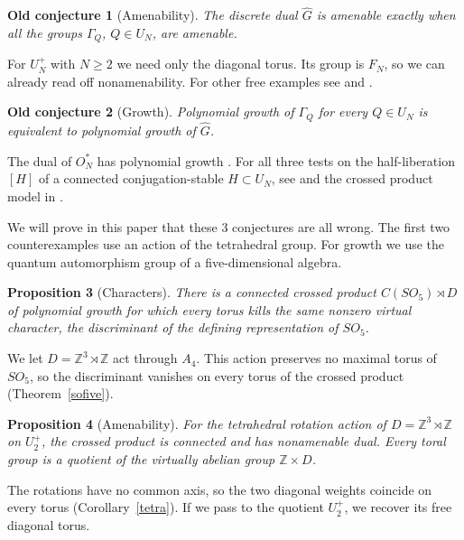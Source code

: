 \documentclass[11pt,a4paper]{article}
\newtheorem{oldconj}{Old conjecture}
\newtheorem{introprop}[oldconj]{Proposition}
\theoremstyle{remark}
\begin{document}
\begin{oldconj}[Amenability]\label{oldamen}
The discrete dual $\widehat G$ is amenable exactly when all the groups
$\Gamma_Q$, $Q\in U_N$, are amenable.
\end{oldconj}

For $U_N^+$ with $N\ge2$ we need only the diagonal torus. Its group
is $F_N$, so we can already read off nonamenability. For other free examples
see \cite[Theorem~4.4]{bp} and \cite[Chapter~14]{qg}.

\begin{oldconj}[Growth]\label{oldgrowth}
Polynomial growth of $\Gamma_Q$ for every $Q\in U_N$ is equivalent to
polynomial growth of $\widehat G$.
\end{oldconj}

The dual of $O_N^*$ has polynomial growth \cite[Section~9]{halforth}.
For all three tests on the half-liberation $[H]$ of a connected
conjugation-stable $H\subset U_N$, see \cite[Theorem~5.5]{bp} and the
crossed product model in \cite{halfhopf}.

We will prove in this paper that these 3 conjectures are all wrong.
The first two counterexamples use an action of the tetrahedral group.
For growth we use the quantum automorphism group of a five-dimensional algebra.

\begin{introprop}[Characters]\label{counterchar}
There is a connected crossed product $C(SO_5)\rtimes D$ of polynomial
growth for which every torus kills the same nonzero virtual character,
the discriminant of the defining representation of $SO_5$.
\end{introprop}

We let $D=\mathbb Z^3\rtimes\mathbb Z$ act through $A_4$. This action preserves no
maximal torus of $SO_5$, so the discriminant vanishes on every torus
of the crossed product
(Theorem~\ref{sofive}).

\begin{introprop}[Amenability]\label{counteramen}
For the tetrahedral rotation action of $D=\mathbb Z^3\rtimes\mathbb Z$
on $U_2^+$, the crossed product is connected and has nonamenable dual.
Every toral group is a quotient of the virtually abelian group
$\mathbb Z\times D$.
\end{introprop}

The rotations have no common axis, so the two diagonal weights coincide
on every torus (Corollary~\ref{tetra}). If we pass to the quotient
$U_2^+$, we recover its free diagonal torus.
\end{document}
